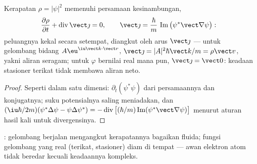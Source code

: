 \begin{proposition}\label{prop:b3:schrodinger-three-dimensions:current}
Kerapatan $\rho = |\psi|^2$ memenuhi persamaan kesinambungan,
\[
\frac{\partial\rho}{\partial t} + \operatorname{div}\vect\jmath = 0 ,
\qquad
\vect\jmath = \frac{\hbar}{m}\,
\operatorname{Im}\big(\psi^*\vect\nabla\psi\big) :
\]
peluangnya kekal secara setempat, diangkut oleh arus
$\vect\jmath$ --- untuk gelombang bidang $A\eu^{\iu\vect k\cdot\vect r}$,
$\vect\jmath = |A|^2\hbar\vect k/m = \rho\vect v$, yakni aliran seragam;
untuk $\varphi$ bernilai real mana pun, $\vect\jmath = \vect 0$:
keadaan stasioner terikat tidak membawa aliran neto.
\end{proposition}

\begin{proof}
Seperti dalam satu dimensi: $\partial_t(\psi^*\psi)$ dari persamaannya
dan konjugatnya; suku potensialnya saling meniadakan, dan $(\iu\hbar/2m)
(\psi^*\Delta\psi - \psi\Delta\psi^*) =
-\operatorname{div}\big[(\hbar/m)\operatorname{Im}(\psi^*\vect\nabla
\psi)\big]$ menurut aturan hasil kali untuk divergensinya.
\end{proof}

\begin{omfigure}

{\small {}: gelombang berjalan mengangkut kerapatannya
bagaikan fluida; fungsi gelombang yang real (terikat, stasioner) diam di
tempat --- awan elektron atom tidak beredar kecuali keadaannya kompleks.}
\end{omfigure}

